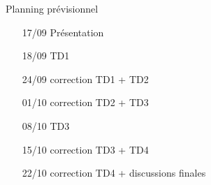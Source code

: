 \documentclass{beamer}
\begin{document}
  \begin{frame}{Planning prévisionnel}
    \centering
    \begin{enumerate}
      \item[17/09] Présentation
      \item[18/09] TD1
      \item[24/09] correction TD1 + TD2
      \item[01/10] correction TD2 + TD3
      \item[08/10] TD3
      \item[15/10] correction TD3 + TD4
      \item[22/10] correction TD4 + discussions finales 
    \end{enumerate}
  \end{frame}
\end{document}
